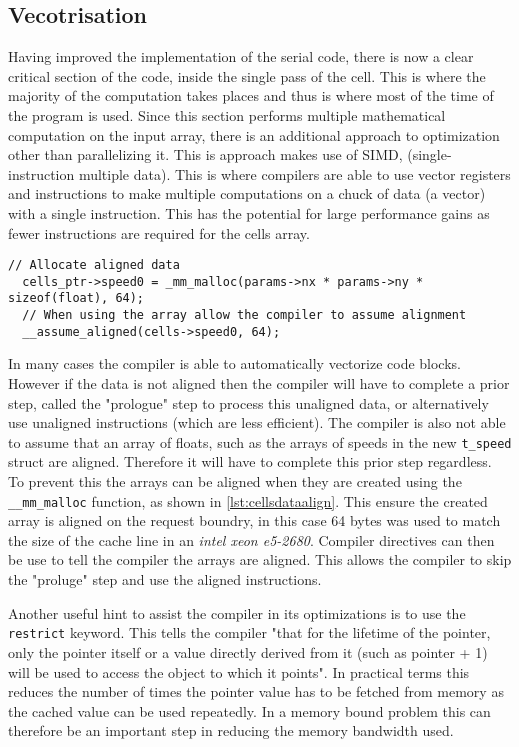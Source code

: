 \documentclass{article}
\begin{document}
\begin{multicols}{2}
\subsection{Vecotrisation}

Having improved the implementation of the serial code, there is now a clear
critical section of the code, inside the single pass of the cell. This is where
the majority of the computation takes places and thus is where most of the time
of the program is used. Since this section performs multiple mathematical
computation on the input array, there is an additional approach to optimization
other than parallelizing it. This is approach makes use of SIMD,
(single-instruction multiple data). This is where compilers are able to use
vector registers and instructions to make multiple computations on a chuck of
data (a vector) with a single instruction. This has the potential for large
performance gains as fewer instructions are required for the cells array.

\begin{lstlisting}[style=CStyle, label={lst:cellsdataalign}, caption={Example of memory allignment for a cells array.},]
  // Allocate aligned data
  cells_ptr->speed0 = _mm_malloc(params->nx * params->ny * sizeof(float), 64);
  // When using the array allow the compiler to assume alignment
  __assume_aligned(cells->speed0, 64);
\end{lstlisting}

In many cases the compiler is able to automatically vectorize code blocks.
However if the data is not aligned then the compiler will have to complete a prior
step, called the "prologue" step to process this unaligned data, or
alternatively use unaligned instructions (which are less efficient). The
compiler is also not able to assume that an array of floats, such as the arrays
of speeds in the new \verb|t_speed| struct are aligned. Therefore it will have
to complete this prior step regardless. To prevent this the arrays can be
aligned when they are created using the \verb|__mm_malloc| function, as shown in \autoref{lst:cellsdataalign}. This
ensure the created array is aligned on the request boundry, in this case 64
bytes was used to match the size of the cache line in an \emph{intel xeon
e5-2680}. Compiler directives can then be use to tell the compiler the arrays
are aligned. This allows the compiler to skip the "proluge" step and use the
aligned instructions.


Another useful hint to assist the compiler in its optimizations is to use the
\verb|restrict| keyword. This tells the compiler "that for the lifetime of the
pointer, only the pointer itself or a value directly derived from it (such as
pointer + 1) will be used to access the object to which it points". In
practical terms this reduces the number of times the pointer value has to be
fetched from memory as the cached value can be used repeatedly. In a memory
bound problem this can therefore be an important step in reducing the memory
bandwidth used.


\end{multicols}
\end{document}

